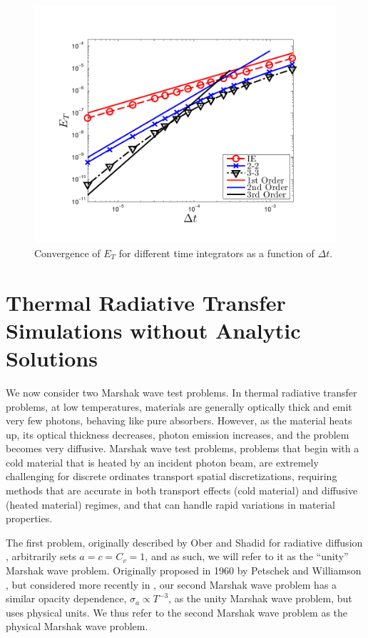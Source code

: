 \begin{figure}[!htp]
\centering
\includegraphics[width=12cm,trim=0.25in  0.2in 0.75in 0.5in,clip=true]{chapter6_grey_radtran/Dissertation_Data/Time_Integrators_Convergence_Temperature.pdf}
\caption{Convergence of $E_{T}$ for different time integrators as a function of $\Delta t$.}
\label{fig:big_dt}
\end{figure}

\pagebreak

\section{Thermal Radiative Transfer Simulations without Analytic Solutions}
\label{sec:marshak_waves}

We now consider two Marshak wave test problems.
In thermal radiative transfer problems, at low temperatures, materials are generally optically thick and emit very few photons, behaving like pure absorbers.
However, as the material heats up, its optical thickness decreases, photon emission increases, and the problem becomes very diffusive.
Marshak wave test problems, problems that begin with a cold material that is heated by an incident photon beam, are extremely challenging for discrete ordinates transport spatial discretizations, requiring methods that are accurate in both transport effects (cold material) and diffusive (heated material) regimes, and that can handle rapid variations in material properties.

The first problem, originally described by Ober and Shadid for radiative diffusion \cite{ober_shadid}, arbitrarily sets $a=c=C_v=1$, and as such, we will refer to it as the ``unity'' Marshak wave problem. 
Originally proposed in 1960 by Petschek and Williamson \cite{physical_marshak}, but considered more recently in \cite{negative_trt,time_adaptive_diffusion}, our second Marshak wave problem has a similar opacity dependence, $\sigma_a \propto T^{-3}$, as the unity Marshak wave problem, but uses physical units.  
We thus refer to the second Marshak wave problem as the physical Marshak wave problem.

